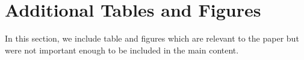 \section{Additional Tables and Figures}
\label{sec:extra}
In this section, we include table and figures which are relevant to the paper but were not important enough to be included in the main content.




% 




